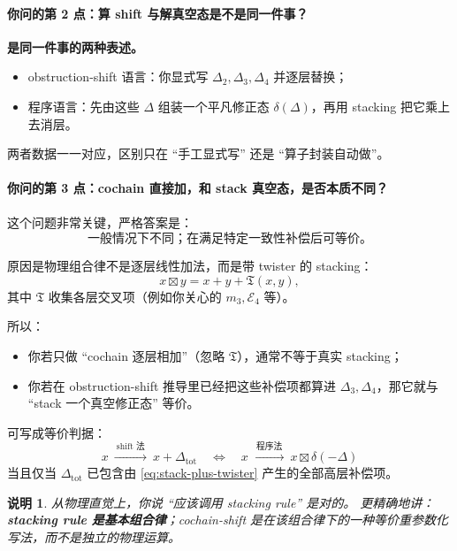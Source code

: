 \documentclass[a4paper,fontset=ubuntu,12pt]{ctexart}
\newtheorem{remark}[definition]{说明}
\begin{document}
\paragraph{你问的第 2 点：算 shift 与解真空态是不是同一件事？}
\textbf{是同一件事的两种表述。}

\begin{itemize}
\item obstruction-shift 语言：你显式写 $\Delta_2,\Delta_3,\Delta_4$ 并逐层替换；
\item 程序语言：先由这些 $\Delta$ 组装一个平凡修正态 $\delta(\Delta)$，再用 stacking 把它乘上去消层。
\end{itemize}
两者数据一一对应，区别只在 ``手工显式写'' 还是 ``算子封装自动做''。

\paragraph{你问的第 3 点：cochain 直接加，和 stack 真空态，是否本质不同？}
这个问题非常关键，严格答案是：
\begin{equation}
\text{一般情况下不同；在满足特定一致性补偿后可等价。}
\label{eq:add-vs-stack-main}
\end{equation}

原因是物理组合律不是逐层线性加法，而是带 twister 的 stacking：
\begin{equation}
x\boxtimes y = x+y+\mathfrak{T}(x,y),
\label{eq:stack-plus-twister}
\end{equation}
其中 $\mathfrak{T}$ 收集各层交叉项（例如你关心的 $m_3,\mathcal{E}_4$ 等）。

所以：
\begin{itemize}
\item 你若只做 ``cochain 逐层相加''（忽略 $\mathfrak{T}$），通常不等于真实 stacking；
\item 你若在 obstruction-shift 推导里已经把这些补偿项都算进 $\Delta_3,\Delta_4$，那它就与 ``stack 一个真空修正态'' 等价。
\end{itemize}

可写成等价判据：
\begin{equation}
x \ \xrightarrow{\ \text{shift 法}\ }\ x+\Delta_{\mathrm{tot}}
\quad\Longleftrightarrow\quad
x \ \xrightarrow{\ \text{程序法}\ }\ x\boxtimes \delta(-\Delta)
\label{eq:equiv-criterion}
\end{equation}
当且仅当 $\Delta_{\mathrm{tot}}$ 已包含由 \eqref{eq:stack-plus-twister} 产生的全部高层补偿项。

\begin{remark}
从物理直觉上，你说 ``应该调用 stacking rule'' 是对的。  
更精确地讲：\textbf{stacking rule 是基本组合律}；cochain-shift 是在该组合律下的一种等价重参数化写法，而不是独立的物理运算。
\end{remark}
\end{document}
